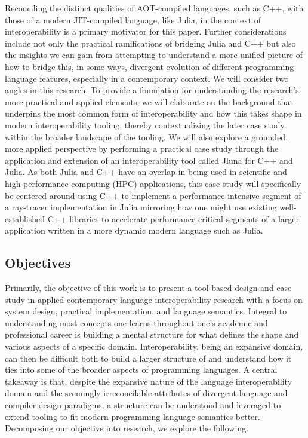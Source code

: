 Reconciling the distinct qualities of AOT-compiled languages, such as C++, with those of a modern JIT-compiled language, like Julia, in the context of interoperability is a primary motivator for this paper. Further considerations include not only the practical ramifications of bridging Julia and C++ but also the insights we can gain from attempting to understand a more unified picture of how to bridge this, in some ways, divergent evolution of different programming language features, especially in a contemporary context. We will consider two angles in this research. To provide a foundation for understanding the research's more practical and applied elements, we will elaborate on the background that underpins the most common form of interoperability and how this takes shape in modern interoperability tooling, thereby contextualizing the later case study within the broader landscape of the tooling. We will also explore a grounded, more applied perspective by performing a practical case study through the application and extension of an interoperability tool called Jluna for C++ and Julia. As both Julia and C++ have an overlap in being used in scientific and high-performance-computing (HPC) applications, this case study will specifically be centered around using C++ to implement a performance-intensive segment of a ray-tracer implementation in Julia mirroring how one might use existing well-established C++ libraries to accelerate performance-critical segments of a larger application written in a more dynamic modern language such as Julia. 

\subsection{Objectives}

Primarily, the objective of this work is to present a tool-based design and case study in applied contemporary language interoperability research with a focus on system design, practical implementation, and language semantics. Integral to understanding most concepts one learns throughout one's academic and professional career is building a mental structure for what defines the shape and various aspects of a specific domain. Interoperability, being an expansive domain, can then be difficult both to build a larger structure of and understand how it ties into some of the broader aspects of programming languages. A central takeaway is that, despite the expansive nature of the language interoperability domain and the seemingly irreconcilable attributes of divergent language and compiler design paradigms, a structure can be understood and leveraged to extend tooling to fit modern programming language semantics better. Decomposing our objective into research, we explore the following.

